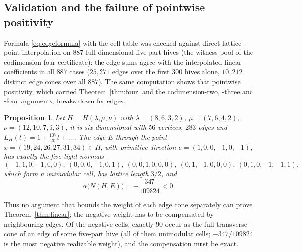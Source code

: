 \documentclass[11pt]{amsart}
\newtheorem{proposition}[theorem]{Proposition}
\theoremstyle{definition}
\newcommand{\lam}{\lambda}
\begin{document}
\subsection{Validation and the failure of pointwise positivity}
Formula \eqref{eq:edgeformula} with the cell table was checked against direct
lattice-point interpolation on $887$ full-dimensional five-part hives (the
witness pool of the codimension-four certificate): the edge sums agree with the
interpolated linear coefficients in all $887$ cases ($25{,}271$ edges over the
first $300$ hives alone, $10{,}212$ distinct edge cones over all $887$). The
same computation shows that pointwise positivity, which carried
Theorem~\ref{thm:four} and the codimension-two, -three and -four arguments,
breaks down for edges.

\begin{proposition}\label{prop:negedge}
Let $H=H(\lam,\mu,\nu)$ with $\lam=(8,6,3,2)$, $\mu=(7,6,4,2)$,
$\nu=(12,10,7,6,3)$; it is six-dimensional with $56$ vertices, $283$ edges and
$L_H(t)=1+\tfrac{107}{20}t+\dots$. The edge $E$ through the point
$x=(19,24,26,27,31,34)\in H$, with primitive direction $e=(1,0,0,-1,0,-1)$, has
exactly the five tight normals
\[
  (-1,1,0,-1,0,0),\ (0,0,0,-1,0,1),\ (0,0,1,0,0,0),\ (0,1,-1,0,0,0),\
  (0,1,0,-1,-1,1),
\]
which form a unimodular cell, has lattice length $3/2$, and
\[
  \alpha\bigl(N(H,E)\bigr)=-\frac{347}{109824}<0.
\]
\end{proposition}

Thus no argument that bounds the weight of each edge cone separately can prove
Theorem~\ref{thm:linear}; the negative weight has to be compensated by
neighbouring edges. Of the negative cells, exactly $90$ occur as the full
transverse cone of an edge of some five-part hive (all of them unimodular
cells; $-347/109824$ is the most negative realizable weight), and the
compensation must be exact.
\end{document}
